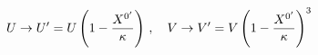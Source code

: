 \begin{equation}
\hspace*{-0.8truecm}U\to U'=U\left( 1-\frac{X^{0'}}{\kappa} \right)\,,\quad
V\to V'=V\left( 1-\frac{X^{0'}}{\kappa} \right)^3
\label{newUV}
\end{equation}

